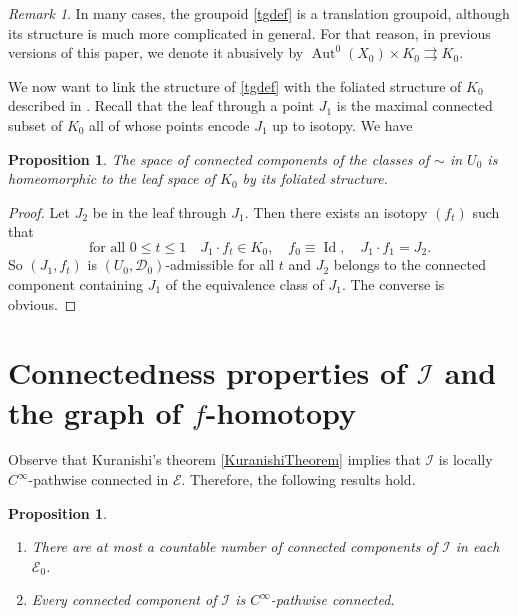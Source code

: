 \documentclass[10pt]{amsart}
\let\mathcal\mathscr
\DeclareMathOperator{\Aut}{Aut}
\DeclareMathOperator{\Id}{Id}
\theoremstyle{plain}
\newtheorem{proposition}[theorem]{Proposition}
\theoremstyle{definition}
\theoremstyle{remark}
\newtheorem{remark}[theorem]{Remark}
\numberwithin{equation}{section}
\newcommand{\Azero}{\Aut^0(X_0)}
\newcommand{\cI}{\mathcal{I}}
\providecommand{\skpt}{\par\smallskip\noindent}
\begin{document}
\begin{remark}
\label{localactionbefore}
In many cases, the groupoid \eqref{tgdef} is a translation groupoid, although its structure is much more complicated in general. For that reason, in previous versions of this paper, we denote it abusively by $\Azero\times K_0\rightrightarrows K_0$.
\end{remark}

We now want to link the structure of \eqref{tgdef} with the foliated structure of $K_0$ \hbox{described} in \cite{ENS}. Recall that the leaf through a point $J_1$ is the maximal connected subset of $K_0$ all of whose points encode $J_1$ up to isotopy. We have
\begin{proposition}
\label{autfol}
The space of connected components of the classes of $\sim$ in $U_0$ is homeomorphic to the leaf space of $K_0$ by its foliated structure.
\end{proposition}
\begin{proof}
Let $J_2$ be in the leaf through $J_1$. Then there exists an isotopy $(f_t)$ such that
\begin{equation*}
\text{for all } 0\leq t\leq 1\quad J_1\cdot f_t\in K_0,\quad f_0\equiv \Id,\quad J_1\cdot f_1=J_2.
\end{equation*}
So $(J_1,f_t)$ is $(U_0,\mathcal D_0)$-admissible for all $t$ and $J_2$ belongs to the connected component containing $J_1$ of the equivalence class of $J_1$. The converse is obvious.
\end{proof}

\section{Connectedness properties of \texorpdfstring{$\cI$}{I} and the graph of \texorpdfstring{$f$}{f}-homotopy}
\label{f-homotopy}

Observe that Kuranishi's theorem \ref{KuranishiTheorem} implies that $\cI$ is locally $C^\infty$-pathwise connected in $\mathcal E$. Therefore, the following results hold.

\skpt
\begin{proposition}
\label{countable1}
\begin{enumerate}
\item
There are at most a countable number of connected components of $\cI$ in each~$\mathcal E_0$.
\item
Every connected component of $\cI$ is $C^\infty$-pathwise connected.
\end{enumerate}
\end{proposition}
\end{document}
